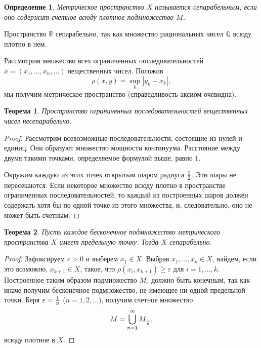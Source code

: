\documentclass{article}
\newtheorem{theorem}{Теорема}[section]
\newtheorem{definition}{Определение}[section]
\begin{document}
\begin{definition}
Метрическое пространство \(X\) называется сепарабельным, если оно содержит счетное всюду плотное подмножество \(M\).
\end{definition}

Пространство \(\mathbb{R}\) сепарабельно, так как множество рациональных чисел \(\mathbb{Q}\) всюду плотно в нем. \newline

Рассмотрим множество всех ограниченных последовательностей \(x = (x_1, ..., x_n, ...)\) вещественных чисел. Положив
\[
\rho(x, y) = \sup\limits_{k} |y_k - x_k|,
\]
мы получим метрическое пространство (справедливость аксиом очевидна).

\begin{theorem}
Пространство ограниченных последовательностей вещественных чисел несепарабельно.
\end{theorem}

\begin{proof}
Рассмотрим всевозможные последовательности, состоящие из нулей и единиц. Они образуют множество мощности континуума. Расстояние между двумя такими точками, определяемое формулой выше, равно \(1\).

Окружим каждую из этих точек открытым шаром радиуса \({1} \over {2}\). Эти шары не пересекаются. Если некоторое множество всюду плотно в пространстве ограниченных последовательностей, то каждый из построенных шаров должен содержать хотя бы по одной точке из этого множества, и, следовательно, оно не может быть счетным.
\end{proof}

\begin{theorem}
Пусть каждое бесконечное подмножество метрического пространства \(X\) имеет предельную точку. Тогда \(X\) сепарабельно.
\end{theorem}

\begin{proof}
Зафиксируем \(\varepsilon > 0\) и выберем \(x_1 \in X\). Выбрав \(x_1, ..., x_{k} \in X\), найдем, если это возможно, \(x_{k + 1} \in X\), такое, что \(\rho(x_i, x_{k + 1}) \geq \varepsilon\) для \(i = 1, ..., k\). Построенное таким образом подмножество \(M_{\varepsilon}\) должно быть конечным, так как иначе получим бесконечное подмножество, не имеющее ни одной предельной точки. Беря \(\varepsilon = {1 \over n}\) (\(n = 1, 2, ...\)), получим счетное множество
\[
M = \bigcup\limits_{n=1}^{\infty}{M_{1 \over n}},
\]
всюду плотное в \(X\).
\end{proof}
\end{document}
